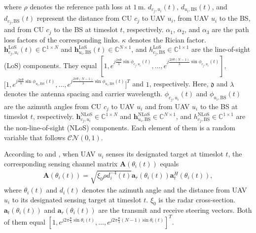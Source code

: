 \documentclass[10pt,journal,compsoc]{IEEEtran}
\begin{document}
where $\rho$ denotes the reference path loss at $1\, \text{m}$. %
$d_{c_{j},u_{i}}(t)$, $d_{u_{i}, \text{BS}}(t)$, and $d_{c_{j}, \text{BS}}(t)$ represent the distance from CU $c_{j}$ to UAV $u_{i}$, from UAV $u_{i}$ to the BS, and from CU $c_{j}$ to the BS at timeslot $t$, respectively.
$\alpha_{1}$, $\alpha_{2}$, and $\alpha_{3}$ are the path loss factors of the corresponding links.
$\kappa$ denotes the Rician factor.
$\bm{h}^{\text{LoS}}_{c_{j}, u_{i}}(t) \in \mathbb{C}^{1 \times N}$ and $\bm{h}^{\text{LoS}}_{u_{i}, \text{BS}}(t) \in \mathbb{C}^{N \times 1}$, and 
$h^{\text{LoS}}_{c_{j}, \text{BS}} \in \mathbb{C}^{1 \times 1}$ are the line-of-sight (LoS) components. They equal  
$\left[1, e^{j\frac{2\pi \mathfrak{d}}{\lambda}\sin\phi_{c_{j}, u_{i}}(t)}, \dots, e^{j\frac{2\pi \mathfrak{d}\left(N - 1\right)}{\lambda}\sin\phi_{c_{j}, u_{i}}(t)}\right]$,
$\Big[1, e^{j\frac{2\pi \mathfrak{d}}{\lambda}\sin\phi_{u_{i}, \text{BS}}(t)}, \dots, e^{j\frac{2\pi \mathfrak{d}\left(N - 1\right)}{\lambda}\sin\phi_{u_{i}, \text{BS}}(t)}\Big]^T$ and 
$1$, respectively. Here, $\mathfrak{d}$ and $\lambda$ denotes the antenna spacing and carrier wavelength. $\phi_{c_{j}, u_{i}}(t)$ and $\phi_{u_{i}, \text{BS}}(t)$ are the azimuth angles from CU $c_{j}$ to UAV $u_{i}$ and from UAV $u_{i}$ to the BS at timeslot $t$, respectively. 
$\bm{h}^{\text{NLoS}}_{c_{j}, u_{i}} \in \mathbb{C}^{1 \times N}$ and $\bm{h}^{\text{NLoS}}_{u_{i}, \text{BS}} \in \mathbb{C}^{N \times 1}$, and 
$h^{\text{NLoS}}_{c_{j}, \text{BS}} \in \mathbb{C}^{1 \times 1}$ are the non-line-of-sight (NLoS) components. Each element of them is a random variable that follows $\mathcal{CN}\left(0, 1\right)$.

According to \cite{Related works:ISCC:TCCN:Collaborative-Optimization-Of} and \cite{Related works:ISCC:TCOM:Joint-Offloading-And}, when UAV $u_{i}$ senses its designated target at timeslot $t$, the corresponding sensing channel matrix $\mathbf{A}(\theta_{i}(t))$ equals 
\begin{align}
    \mathbf{A}(\theta_{i}(t))=\sqrt{\xi_{0} \rho d_{i}^{-4}(t)} \bm{a}_{r}\left(\theta_{i}(t)\right)\bm{a}^{H}_{t}\left(\theta_{i}(t)\right),
\end{align}
where $\theta_{i}(t)$ and $d_{i}(t)$ denotes the azimuth angle and the distance from UAV $u_{i}$ to its designated sensing target at timeslot $t$. $\xi_{0}$ is the radar cross-section. $\bm{a}_{t}(\theta_{i}(t))$ and $\bm{a}_{r}(\theta_{i}(t))$ are the transmit and receive steering vectors. Both of them equal $\left[1, e^{j 2 \pi  \frac{\mathfrak{d}}{\lambda}\sin \theta_{i}(t)}, \ldots, e^{j 2 \pi \frac{\mathfrak{d}}{\lambda} (N - 1) \sin \theta_{i}(t)}\right]^{T}$.
\end{document}
